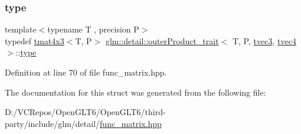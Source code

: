 \subsubsection{\texorpdfstring{type}{type}}
{\footnotesize\ttfamily template$<$typename T , precision P$>$ \\
typedef \mbox{\hyperlink{structglm_1_1tmat4x3}{tmat4x3}}$<$T, P$>$ \mbox{\hyperlink{structglm_1_1detail_1_1outer_product__trait}{glm\+::detail\+::outer\+Product\+\_\+trait}}$<$ T, P, \mbox{\hyperlink{structglm_1_1tvec3}{tvec3}}, \mbox{\hyperlink{structglm_1_1tvec4}{tvec4}} $>$\+::\mbox{\hyperlink{structglm_1_1detail_1_1outer_product__trait_3_01_t_00_01_p_00_01tvec3_00_01tvec4_01_4_ad7ef7d688ded0e316f8b5702a834a68f}{type}}}



Definition at line 70 of file func\+\_\+matrix.\+hpp.



The documentation for this struct was generated from the following file\+:\begin{DoxyCompactItemize}
\item 
D\+:/\+V\+C\+Repos/\+Open\+G\+L\+T6/\+Open\+G\+L\+T6/third-\/party/include/glm/detail/\mbox{\hyperlink{func__matrix_8hpp}{func\+\_\+matrix.\+hpp}}\end{DoxyCompactItemize}
